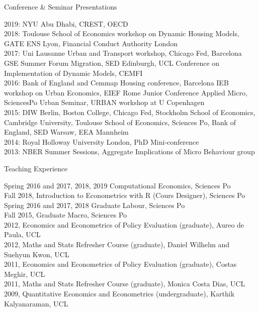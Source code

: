 \documentclass{cvjobmarket} %
\begin{document}

\begin{rSection}{Conference \& Seminar Presentations}

{2019: NYU Abu Dhabi, CREST, OECD}\\
{2018: Toulouse School of Economics workshop on Dynamic Housing Models, GATE ENS Lyon, Financial Conduct Authority London}\\
{2017: Uni Lausanne Urban and Transport workshop, Chicago Fed, Barcelona GSE Summer Forum Migration, SED Edinburgh, UCL Conference on Implementation of Dynamic Models, CEMFI}\\
{2016: Bank of England and Cemmap Housing conference, Barcelona IEB workshop on Urban Economics, EIEF Rome Junior Conference Applied Micro, SciencesPo Urban Seminar, URBAN workshop at U Copenhagen}\\
{2015: DIW Berlin, Boston College, Chicago Fed, Stockholm School of Economics, Cambridge University, Toulouse School of Economics, Sciences Po, Bank of England, SED Warsaw, EEA Mannheim}\\
{2014: Royal Holloway University London, PhD Mini-conference}\\
{2013: NBER Summer Sessions, Aggregate Implications of Micro Behaviour group}\\

\end{rSection}

\begin{rSection}{Teaching Experience}

{Spring 2016 and 2017, 2018, 2019 Computational Economics, Sciences Po}\\
{Fall 2018, Introduction to Econometrics with R (Cours Designer), Sciences Po}\\
{Spring 2016 and 2017, 2018 Graduate Labour, Sciences Po}\\
{Fall 2015, Graduate Macro, Sciences Po}\\
{2012, Economics and Econometrics of Policy Evaluation (graduate), Aureo de Paula, UCL}\\
{2012, Maths and Stats Refresher Course (graduate), Daniel Wilhelm and Suehyun Kwon, UCL}\\
{2011, Economics and Econometrics of Policy Evaluation (graduate), Costas Meghir, UCL}\\
{2011, Maths and Stats Refresher Course (graduate), Monica Costa Dias, UCL }\\
{2009, Quantitative Economics and Econometrics (undergraduate), Karthik Kalyanaraman, UCL}\\

\end{rSection}
\end{document}
